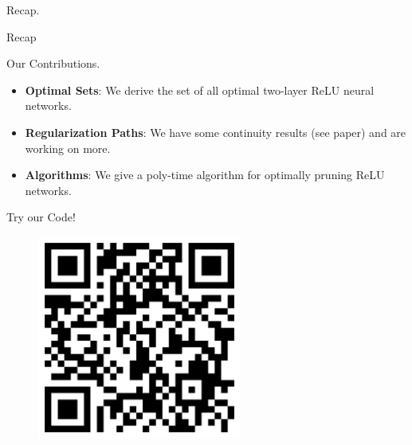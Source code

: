 \documentclass[usenames,dvipsnames,mathserif,notheorems]{beamer}
\begin{document}

\begin{frame}{}
	\begin{center}
		\huge Recap.
	\end{center}
\end{frame}

\begin{frame}{Recap}
	\begin{center}
		\huge   Our Contributions.
	\end{center}

	\vspace{2em}
	\pause
	{ \large
		\begin{itemize}
			\item \textbf{Optimal Sets}: We derive the set of all optimal
			      two-layer ReLU neural networks.
			      \pause
			      \vspace{0.5em}

			\item \textbf{Regularization Paths}: We have some continuity
			      results (see paper) and are working on more.
			      \pause
			      \vspace{0.5em}

			\item \textbf{Algorithms}: We give a poly-time algorithm for
			      optimally pruning ReLU networks.

		\end{itemize}
	}

\end{frame}




\begin{frame}{}
	\begin{center}
		\huge Try our Code!
	\end{center}

	\begin{figure}[]
		\centering
		\includegraphics[width=0.6\textwidth]{assets/github.png}
	\end{figure}
\end{frame}
\end{document}
